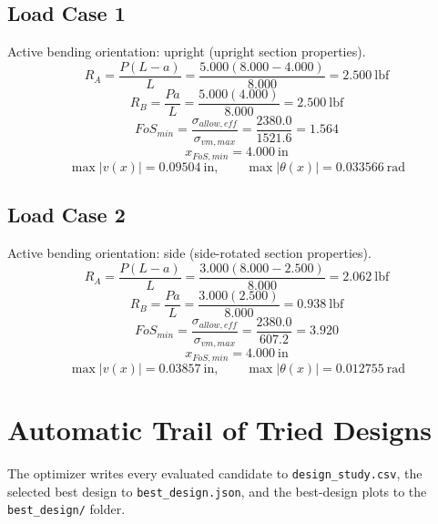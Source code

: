 \documentclass[11pt]{article}
\begin{document}
\subsection*{Load Case 1}
Active bending orientation: upright (upright section properties).
\[R_A = \frac{P(L-a)}{L} = \frac{5.000(8.000-4.000)}{8.000} = 2.500\ \mathrm{lbf}\]
\[R_B = \frac{Pa}{L} = \frac{5.000(4.000)}{8.000} = 2.500\ \mathrm{lbf}\]
\[FoS_{min} = \frac{\sigma_{allow,eff}}{\sigma_{vm,max}} = \frac{2380.0}{1521.6} = 1.564\]
\[x_{FoS,min} = 4.000\ \mathrm{in}\]
\[\max |v(x)| = 0.09504\ \mathrm{in}, \qquad \max |\theta(x)| = 0.033566\ \mathrm{rad}\]
\subsection*{Load Case 2}
Active bending orientation: side (side-rotated section properties).
\[R_A = \frac{P(L-a)}{L} = \frac{3.000(8.000-2.500)}{8.000} = 2.062\ \mathrm{lbf}\]
\[R_B = \frac{Pa}{L} = \frac{3.000(2.500)}{8.000} = 0.938\ \mathrm{lbf}\]
\[FoS_{min} = \frac{\sigma_{allow,eff}}{\sigma_{vm,max}} = \frac{2380.0}{607.2} = 3.920\]
\[x_{FoS,min} = 4.000\ \mathrm{in}\]
\[\max |v(x)| = 0.03857\ \mathrm{in}, \qquad \max |\theta(x)| = 0.012755\ \mathrm{rad}\]

\section*{Automatic Trail of Tried Designs}
The optimizer writes every evaluated candidate to \texttt{design\_study.csv}, the selected best design to \texttt{best\_design.json}, and the best-design plots to the \texttt{best\_design/} folder.
\end{document}
